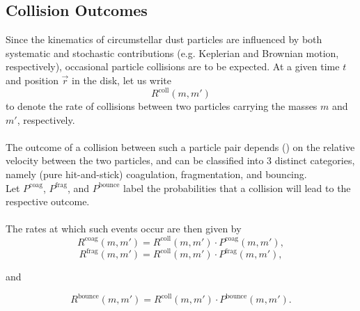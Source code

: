     \subsection{Collision Outcomes}

        Since the kinematics of circumstellar dust particles are influenced by both systematic and 
        stochastic contributions (e.g. Keplerian and Brownian motion, respectively), occasional
        particle collisions are to be expected. At a given time $t$ and position $\vec r$ in the
        disk, let us write $$R^\text{coll}(m,m')$$ to denote the rate of collisions between two
        particles carrying the masses $m$ and $m'$, respectively. \\

         \\
        
        The outcome of a collision between such a particle pair depends ()
        on the relative velocity between the two particles, and can be classified into 3 distinct 
        categories, namely (pure hit-and-stick) coagulation, fragmentation, and bouncing.\\
        
        Let $P^\text{coag}$, $P^\text{frag}$, and $P^\text{bounce}$
        label the probabilities that a collision will lead to the respective outcome. \\

         \\
        
        The rates at which such events occur are then given by
        \begin{equation}
            R^\text{coag}(m,m')
                =R^\text{coll}(m,m')\cdot P^\text{coag}(m,m'),
        \end{equation}
        \begin{equation}
            R^\text{frag}(m,m')
                =R^\text{coll}(m,m')\cdot P^\text{frag}(m,m'),
        \end{equation}
        \begin{center}and\end{center}
        \begin{equation}
            R^\text{bounce}(m,m')
                =R^\text{coll}(m,m')\cdot P^\text{bounce}(m,m').
        \end{equation}
        
